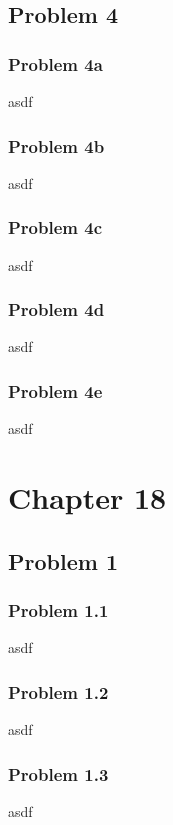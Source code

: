 \documentclass{article}
\begin{document}
\subsection{Problem 4}
\subsubsection{Problem 4a}
asdf

\subsubsection{Problem 4b}
asdf

\subsubsection{Problem 4c}
asdf

\subsubsection{Problem 4d}
asdf

\subsubsection{Problem 4e}
asdf


\newpage
\section{\textbf{Chapter 18}}
\subsection{Problem 1}
\subsubsection{Problem 1.1}
asdf


\subsubsection{Problem 1.2}
asdf


\subsubsection{Problem 1.3}
asdf
\end{document}
